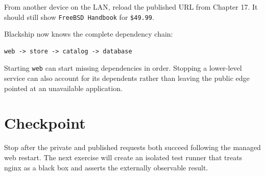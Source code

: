 From another device on the LAN, reload the published URL from Chapter 17. It
should still show \texttt{FreeBSD Handbook} for \texttt{\$49.99}.

Blackship now knows the complete dependency chain:

\begin{lstlisting}
web -> store -> catalog -> database
\end{lstlisting}

Starting \texttt{web} can start missing dependencies in order. Stopping a
lower-level service can also account for its dependents rather than leaving
the public edge pointed at an unavailable application.

\section{Checkpoint}

Stop after the private and published requests both succeed following the
managed web restart. The next exercise will create an isolated test runner that
treats nginx as a black box and asserts the externally observable result.
